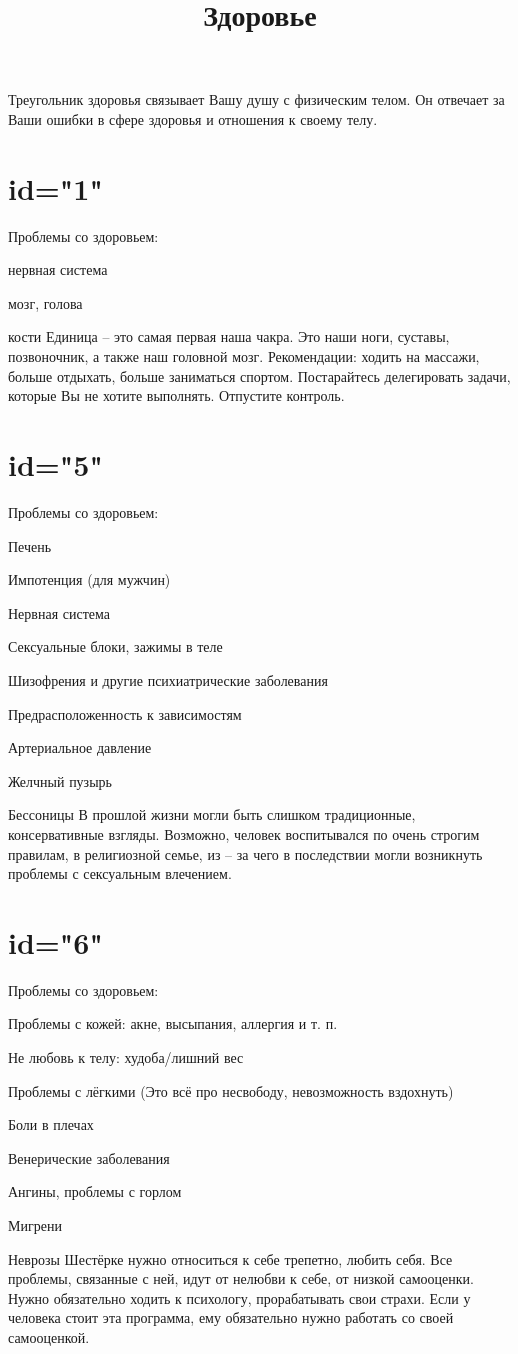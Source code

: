 \title{Здоровье}
\description
Треугольник здоровья связывает Вашу душу с физическим телом. 
Он отвечает за Ваши ошибки в сфере здоровья и отношения к своему телу.
\enddescription

\section{id="1"}{Проблемы со здоровьем:}
\item нервная система
\item мозг, голова
\item кости
Единица – это самая первая наша чакра. Это наши ноги, суставы, 
позвоночник, а также наш головной мозг.
Рекомендации: ходить на массажи, больше отдыхать, больше заниматься 
спортом. Постарайтесь делегировать задачи, которые Вы не хотите 
выполнять. Отпустите контроль.
\endsection

\section{id="5"}{Проблемы со здоровьем:}
\item Печень
\item Импотенция (для мужчин)
\item Нервная система
\item Сексуальные блоки, зажимы в теле
\item Шизофрения и другие психиатрические заболевания
\item Предрасположенность к зависимостям
\item Артериальное давление
\item Желчный пузырь
\item Бессоницы
В прошлой жизни могли быть слишком традиционные, консервативные 
взгляды. Возможно, человек воспитывался по очень строгим правилам, 
в религиозной семье, из – за чего в последствии могли возникнуть 
проблемы с сексуальным влечением.
\endsection

\section{id="6"}{Проблемы со здоровьем:}
\item Проблемы с кожей: акне, высыпания, аллергия и т. п.
\item Не любовь к телу: худоба/лишний вес
\item Проблемы с лёгкими (Это всё про несвободу, невозможность вздохнуть)
\item Боли в плечах
\item Венерические заболевания
\item Ангины, проблемы с горлом
\item Мигрени
\item Неврозы
Шестёрке нужно относиться к себе трепетно, любить себя. 
Все проблемы, связанные с ней, идут от нелюбви к себе, от низкой 
самооценки. Нужно обязательно ходить к психологу, прорабатывать 
свои страхи. Если у человека стоит эта программа, ему обязательно 
нужно работать со своей самооценкой.
\endsection


